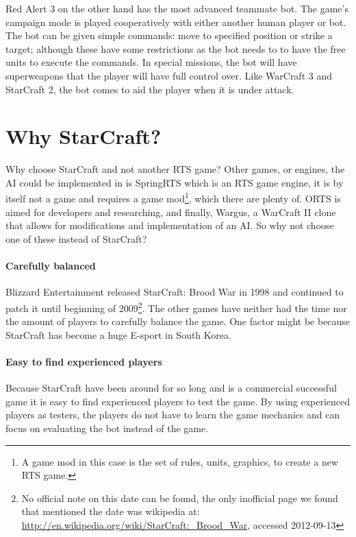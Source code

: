 Red Alert 3\cite{redalert3} on the other hand has the most advanced teammate bot. The game’s campaign mode is played cooperatively with either another human player or bot. The bot can be given simple commands: move to specified position or strike a target; although these have some restrictions as the bot needs to to have the free units to execute the commands. In special missions, the bot will have superweapons that the player will have full control over. Like WarCraft 3 and StarCraft 2, the bot comes to aid the player when it is under attack.

\section{Why StarCraft?}
\label{sec:why_starcraft}	
Why choose StarCraft and not another RTS game? Other games, or engines, the AI could be implemented in is SpringRTS\cite{springrts} which is an RTS game engine, it is by itself not a game and requires a game mod\footnote{A game mod in this case is the set of rules, units, graphics, to create a new RTS game.}, which there are plenty of. ORTS\cite{orts} is aimed for developers and researching, and finally, Wargus\cite{wargus}, a WarCraft II clone that allows for modifications and implementation of an AI. So why not choose one of these instead of StarCraft?

\paragraph{Carefully balanced}
Blizzard Entertainment released StarCraft: Brood War in 1998 and continued to patch it until beginning of 2009\footnote{No official note on this date can be found, the only inofficial page we found that mentioned the date was wikipedia at: \url{http://en.wikipedia.org/wiki/StarCraft:_Brood_War}, accessed 2012-09-13}. The other games have neither had the time nor the amount of players to carefully balance the game. One factor might be because StarCraft has become a huge E-sport in South Korea\cite{scKotakuKorea}.

\paragraph{Easy to find experienced players}
Because StarCraft have been around for so long and is a commercial successful game it is easy to find experienced players to test the game. By using experienced players as testers, the players do not have to learn the game mechanics and can focus on evaluating the bot instead of the game.

